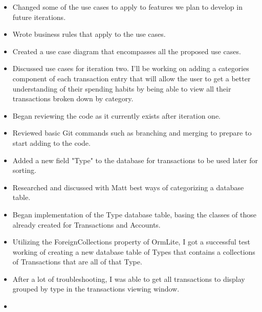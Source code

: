 \documentclass{article}
\begin{document}
	\begin{itemize}
		\item Changed some of the use cases to apply to features we plan to develop in 					future iterations.
		\item Wrote business rules that apply to the use cases.
		\item Created a use case diagram that encompasses all the proposed use cases.
	\end{itemize}
	
	\begin{itemize}
		\item Discussed use cases for iteration two. I'll be working on adding a 						categories component of each transaction entry that will allow the user to 					get a better understanding of their spending habits by being able to view 					all their transactions broken down by category. 
	\end{itemize}
	
	\begin{itemize}
		\item Began reviewing the code as it currently exists after iteration one.
		\item Reviewed basic Git commands such as branching and merging to prepare to 					start adding to the code. 
	\end{itemize}
	
	\begin{itemize}
		\item Added a new field "Type" to the database for transactions to be used later 			for sorting.
		\item Researched and discussed with Matt best ways of categorizing a database 					table. 
	\end{itemize}
	
	\begin{itemize}
		\item Began implementation of the Type database table, basing the classes of 					those already created for Transactions and Accounts.
		\item Utilizing the ForeignCollections property of OrmLite, I got a successful 					test working of creating a new database table of Types that contains a 							collections of Transactions that are all of that Type.
		\item After a lot of troubleshooting, I was able to get all transactions to display 			grouped by type in the transactions viewing window.
	\end{itemize}
	
	\begin{itemize}
		\item  
	\end{itemize}
	
\end{document}
